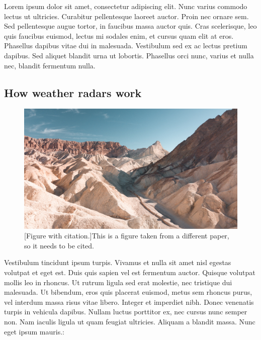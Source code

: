 \begin{multicols}{2}


Lorem ipsum dolor sit amet, consectetur adipiscing elit. Nunc varius commodo lectus ut ultricies. Curabitur pellentesque laoreet auctor. Proin nec ornare sem. Sed pellentesque augue tortor, in faucibus massa auctor quis. Cras scelerisque, leo quis faucibus euismod, lectus mi sodales enim, et cursus quam elit at eros. Phasellus dapibus vitae dui in malesuada. Vestibulum sed ex ac lectus pretium dapibus. Sed aliquet blandit urna ut lobortis. Phasellus orci nunc, varius et nulla nec, blandit fermentum nulla.

\bigskip

\subsection*{How weather radars work}

\begin{figure}[ht!]
\begin{center}
\includegraphics[width=\linewidth]{./Figures/image4.jpg}
[Figure with citation.]{This is a figure taken from a different paper, so it needs to be cited. \citep{heistermann_emergence_2014}}
\label{fig:BC_fig1_intro}
\end{center}
\end{figure}

Vestibulum tincidunt ipsum turpis. Vivamus et nulla sit amet nisl egestas volutpat et eget est. Duis quis sapien vel est fermentum auctor. Quisque volutpat mollis leo in rhoncus. Ut rutrum ligula sed erat molestie, nec tristique dui malesuada. Ut bibendum, eros quis placerat euismod, metus sem rhoncus purus, vel interdum massa risus vitae libero. Integer et imperdiet nibh. Donec venenatis turpis in vehicula dapibus. Nullam luctus porttitor ex, nec cursus nunc semper non. Nam iaculis ligula ut quam feugiat ultricies. Aliquam a blandit massa. Nunc eget ipsum mauris.:


\end{multicols}
